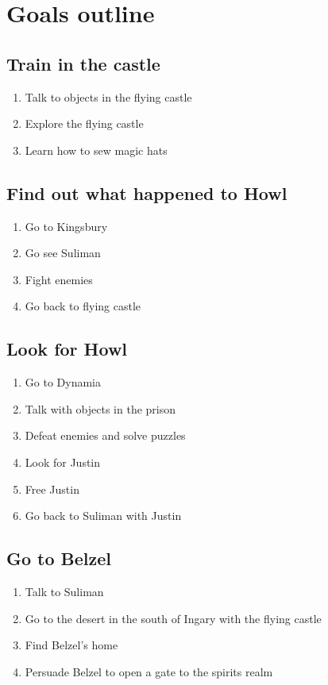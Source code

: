 \section{Goals outline}

\subsection{Train in the castle}
\begin{enumerate}
\item Talk to objects in the flying castle
\item Explore the flying castle
\item Learn how to sew magic hats
\end{enumerate}

\subsection{Find out what happened to Howl}
\begin{enumerate}
\item Go to Kingsbury
\item Go see Suliman
\item Fight enemies
\item Go back to flying castle
\end{enumerate}

\subsection{Look for Howl}
\begin{enumerate}
\item Go to Dynamia
\item Talk with objects in the prison
\item Defeat enemies and solve puzzles
\item Look for Justin
\item Free Justin
\item Go back to Suliman with Justin
\end{enumerate}

\subsection{Go to Belzel}
\begin{enumerate}
\item Talk to Suliman
\item Go to the desert in the south of Ingary with the flying castle
\item Find Belzel’s home
\item Persuade Belzel to open a gate to the spirits realm
\end{enumerate}

